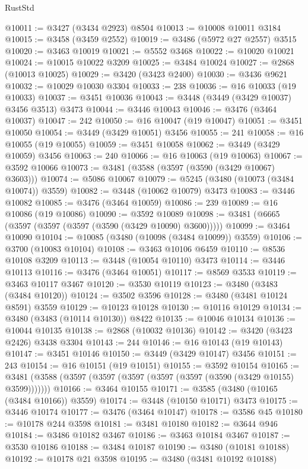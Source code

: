 \begin{lexlean}{RustStd}
\begin{coremodule}
{\begin{coremodule}
{{{{{{{{{{{{{{{{{{{{{{{{{{{{{{{{{{{{{{{{{{{{{{{{{{{{{{{{{{{{{{{{{{{{{{{{{{{{{{{{{{{{{@10011 := @3427 (@3434 @2923) @8504
@10013 := @10008 @10011 @3184
@10015 := @3458 (@3459 @2552)
@10019 := @3486 (@5972 @27 @2557) @3515
@10020 := @3463 @10019
@10021 := @5552 @3468
@10022 := @10020 @10021
@10024 := @10015 @10022 @3209
@10025 := @3484 @10024
@10027 := @2868 (@10013 @10025)
@10029 := @3420 (@3423 @2400)
@10030 := @3436 @9621
@10032 := @10029 @10030 @3304
@10033 := 238
@10036 := @16 @10033 (@19 @10033)
@10037 := @3451 @10036
@10043 := @3448 (@3449 (@3429 @10037) @3456 @3513) @3473
@10044 := @3446 @10043
@10046 := @3476 (@3464 @10037)
@10047 := 242
@10050 := @16 @10047 (@19 @10047)
@10051 := @3451 @10050
@10054 := @3449 (@3429 @10051) @3456
@10055 := 241
@10058 := @16 @10055 (@19 @10055)
@10059 := @3451 @10058
@10062 := @3449 (@3429 @10059) @3456
@10063 := 240
@10066 := @16 @10063 (@19 @10063)
@10067 := @3592 @10066
@10073 := @3481 (@3588 (@3597 (@3590 (@3429 @10067) @3603)))
@10074 := @5086 @10067
@10079 := @5245 (@3480 (@10073 (@3484 @10074)) @3559)
@10082 := @3448 (@10062 @10079) @3473
@10083 := @3446 @10082
@10085 := @3476 (@3464 @10059)
@10086 := 239
@10089 := @16 @10086 (@19 @10086)
@10090 := @3592 @10089
@10098 := @3481 (@6665 (@3597 (@3597 (@3597 (@3590 (@3429 @10090) @3600)))))
@10099 := @3464 @10090
@10104 := @10085 (@3480 (@10098 (@3484 @10099)) @3559)
@10106 := @3700 (@10083 @10104)
@10108 := @3463 @10106 @6459
@10110 := @8536 @10108 @3209
@10113 := @3448 (@10054 @10110) @3473
@10114 := @3446 @10113
@10116 := @3476 (@3464 @10051)
@10117 := @8569 @3533
@10119 := @3463 @10117 @3467
@10120 := @3530 @10119
@10123 := @3480 (@3483 (@3484 @10120))
@10124 := @3502 @3596
@10128 := @3480 (@3481 @10124 @8591) @3559
@10129 := @10123 @10128
@10130 := @10116 @10129
@10134 := @3480 (@3483 (@10114 @10130)) @8422
@10135 := @10046 @10134
@10136 := @10044 @10135
@10138 := @2868 (@10032 @10136)
@10142 := @3420 (@3423 @2426) @3438 @3304
@10143 := 244
@10146 := @16 @10143 (@19 @10143)
@10147 := @3451 @10146
@10150 := @3449 (@3429 @10147) @3456
@10151 := 243
@10154 := @16 @10151 (@19 @10151)
@10155 := @3592 @10154
@10165 := @3481 (@3588 (@3597 (@3597 (@3597 (@3597 (@3597 (@3590 (@3429 @10155) @3599)))))))
@10166 := @3464 @10155
@10171 := @3585 (@3480 (@10165 (@3484 @10166)) @3559)
@10174 := @3448 (@10150 @10171) @3473
@10175 := @3446 @10174
@10177 := @3476 (@3464 @10147)
@10178 := @3586 @45
@10180 := @10178 @244 @3598
@10181 := @3481 @10180
@10182 := @3644 @946
@10184 := @3486 @10182 @3467
@10186 := @3463 @10184 @3467
@10187 := @3530 @10186
@10188 := @3484 @10187
@10190 := @3480 (@10181 @10188)
@10192 := @10178 @21 @3598
@10195 := @3480 (@3481 @10192 @10188)
}}}}}}}}}}}}}}}}}}}}}}}}}}}}}}}}}}}}}}}}}}}}}}}}}}}}}}}}}}}}}}}}}}}}}}}}}}}}}}}}}}}}}
\end{coremodule}}
\end{coremodule}
\end{lexlean}
